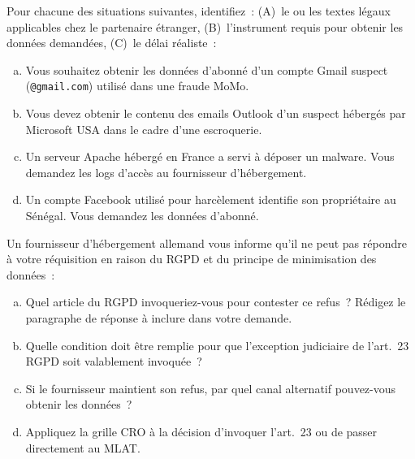 \begin{boxexo}[title={\ding{45}\quad Exercice~11.1. Identification du cadre légal \niveaubase}]
Pour chacune des situations suivantes, identifiez~: (A)~le ou les textes
légaux applicables chez le partenaire étranger, (B)~l'instrument requis
pour obtenir les données demandées, (C)~le délai réaliste~:
\begin{enumerate}[(a)]
    \item Vous souhaitez obtenir les données d'abonné d'un compte Gmail
          suspect (\texttt{@gmail.com}) utilisé dans une fraude MoMo.
    \item Vous devez obtenir le contenu des emails Outlook d'un suspect
          hébergés par Microsoft USA dans le cadre d'une escroquerie.
    \item Un serveur Apache hébergé en France a servi à déposer un malware.
          Vous demandez les logs d'accès au fournisseur d'hébergement.
    \item Un compte Facebook utilisé pour harcèlement identifie son
          propriétaire au Sénégal. Vous demandez les données d'abonné.
\end{enumerate}
\end{boxexo}

\begin{boxexo}[title={\ding{45}\quad Exercice~11.2. Tensions RGPD \niveaumoyen}]
Un fournisseur d'hébergement allemand vous informe qu'il ne peut pas
répondre à votre réquisition en raison du RGPD et du principe de
minimisation des données~:
\begin{enumerate}[(a)]
    \item Quel article du RGPD invoqueriez-vous pour contester ce refus~?
          Rédigez le paragraphe de réponse à inclure dans votre demande.
    \item Quelle condition doit être remplie pour que l'exception judiciaire
          de l'art.~23 RGPD soit valablement invoquée~?
    \item Si le fournisseur maintient son refus, par quel canal alternatif
          pouvez-vous obtenir les données~?
    \item Appliquez la grille CRO à la décision d'invoquer l'art.~23
          ou de passer directement au MLAT.
\end{enumerate}
\end{boxexo}

